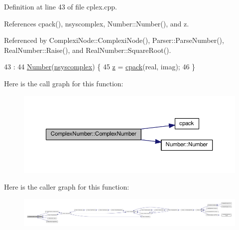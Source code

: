 Definition at line 43 of file cplex.\+cpp.



References cpack(), nsyscomplex, Number\+::\+Number(), and z.



Referenced by Complexi\+Node\+::\+Complexi\+Node(), Parser\+::\+Parse\+Number(), Real\+Number\+::\+Raise(), and Real\+Number\+::\+Square\+Root().


\begin{DoxyCode}
43                                                      :
44     \hyperlink{structNumber_afd3c2f9b4b288e339f741a6e4ae54593}{Number}(\hyperlink{numb_8h_a1475a201d2346881ce88dfbacf628c7da3b38c947375a3db3a4bc184a11c8ee42}{nsyscomplex}) \{
45     \hyperlink{structComplexNumber_a5f72da71f4ce0d88076a391369239042}{z} = \hyperlink{complex_8h_a980e6e049f7902b05fc9eb5614b07a5c}{cpack}(real, imag);
46 \}
\end{DoxyCode}


Here is the call graph for this function\+:
\nopagebreak
\begin{figure}[H]
\begin{center}
\leavevmode
\includegraphics[width=350pt]{db/d8e/structComplexNumber_af0a78be5e675c845b8dc2bf8e5e8f32b_cgraph}
\end{center}
\end{figure}




Here is the caller graph for this function\+:
\nopagebreak
\begin{figure}[H]
\begin{center}
\leavevmode
\includegraphics[width=350pt]{db/d8e/structComplexNumber_af0a78be5e675c845b8dc2bf8e5e8f32b_icgraph}
\end{center}
\end{figure}


